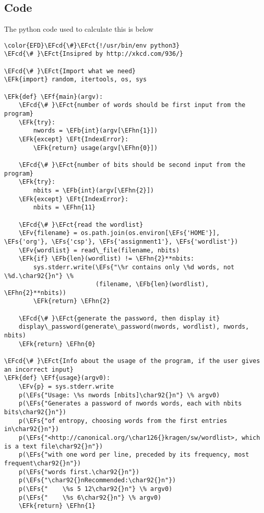 \documentclass{scrartcl}
\newcommand{\EFk}[1]{\textcolor{EFk}{#1}} %
\newcommand{\EFt}[1]{\textcolor{EFt}{#1}} %
\newcommand{\EFs}[1]{\textcolor{EFs}{#1}} %
\newcommand{\EFb}[1]{\textcolor{EFb}{#1}} %
\newcommand{\EFct}[1]{\textcolor{EFct}{#1}} %
\newcommand{\EFv}[1]{\textcolor{EFv}{#1}} %
\newcommand{\EFf}[1]{\textcolor{EFf}{#1}} %
\newcommand{\EFcd}[1]{\textcolor{EFcd}{#1}} %
\newcommand{\EFhn}[1]{#1} %
\begin{document}
\subsection{Code}
\label{sec:org35cbaf7}
The python code used to calculate this is below
\begin{Code}
\begin{Verbatim}[]
\color{EFD}\EFcd{\#}\EFct{!/usr/bin/env python3}
\EFcd{\# }\EFct{Insipred by http://xkcd.com/936/}

\EFcd{\# }\EFct{Import what we need}
\EFk{import} random, itertools, os, sys

\EFk{def} \EFf{main}(argv):
    \EFcd{\# }\EFct{number of words should be first input from the program}
    \EFk{try}:
        nwords = \EFb{int}(argv[\EFhn{1}])
    \EFk{except} \EFt{IndexError}:
        \EFk{return} usage(argv[\EFhn{0}])

    \EFcd{\# }\EFct{number of bits should be second input from the program}
    \EFk{try}:
        nbits = \EFb{int}(argv[\EFhn{2}])
    \EFk{except} \EFt{IndexError}:
        nbits = \EFhn{11}

    \EFcd{\# }\EFct{read the wordlist}
    \EFv{filename} = os.path.join(os.environ[\EFs{'HOME'}], \EFs{'org'}, \EFs{'csp'}, \EFs{'assignment1'}, \EFs{'wordlist'})
    \EFv{wordlist} = read\_file(filename, nbits)
    \EFk{if} \EFb{len}(wordlist) != \EFhn{2}**nbits:
        sys.stderr.write(\EFs{"\%r contains only \%d words, not \%d.\char92{}n"} \%
                         (filename, \EFb{len}(wordlist), \EFhn{2}**nbits))
        \EFk{return} \EFhn{2}

    \EFcd{\# }\EFct{generate the password, then display it}
    display\_password(generate\_password(nwords, wordlist), nwords, nbits)
    \EFk{return} \EFhn{0}

\EFcd{\# }\EFct{Info about the usage of the program, if the user gives an incorrect input}
\EFk{def} \EFf{usage}(argv0):
    \EFv{p} = sys.stderr.write
    p(\EFs{"Usage: \%s nwords [nbits]\char92{}n"} \% argv0)
    p(\EFs{"Generates a password of nwords words, each with nbits bits\char92{}n"})
    p(\EFs{"of entropy, choosing words from the first entries in\char92{}n"})
    p(\EFs{"<http://canonical.org/\char126{}kragen/sw/wordlist>, which is a text file\char92{}n"})
    p(\EFs{"with one word per line, preceded by its frequency, most frequent\char92{}n"})
    p(\EFs{"words first.\char92{}n"})
    p(\EFs{"\char92{}nRecommended:\char92{}n"})
    p(\EFs{"    \%s 5 12\char92{}n"} \% argv0)
    p(\EFs{"    \%s 6\char92{}n"} \% argv0)
    \EFk{return} \EFhn{1}


\end{Verbatim}
\end{Code}
\end{document}
